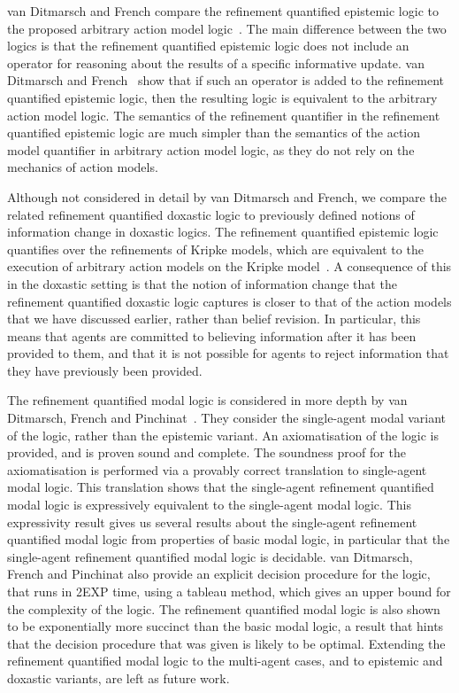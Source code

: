 van Ditmarsch and French compare the refinement quantified epistemic logic to
the proposed arbitrary action model logic~\cite{french2009simulation}. The main
difference between the two logics is that the refinement quantified epistemic
logic does not include an operator for reasoning about the results of a specific
informative update. van Ditmarsch and French~\cite{french2009simulation} show
that if such an operator is added to the refinement quantified epistemic logic,
then the resulting logic is equivalent to the arbitrary action model logic. The
semantics of the refinement quantifier in the refinement quantified epistemic
logic are much simpler than the semantics of the action model quantifier in
arbitrary action model logic, as they do not rely on the mechanics of action
models.

Although not considered in detail by van Ditmarsch and French, we compare the
related refinement quantified doxastic logic to previously defined notions of
information change in doxastic logics. The refinement quantified epistemic logic
quantifies over the refinements of Kripke models, which are equivalent to the
execution of arbitrary action models on the Kripke
model~\cite{french2009simulation}. A consequence of this in the doxastic setting
is that the notion of information change that the refinement quantified doxastic
logic captures is closer to that of the action models that we have discussed
earlier, rather than belief revision. In particular, this means that agents are
committed to believing information after it has been provided to them, and that
it is not possible for agents to reject information that they have previously
been provided.

The refinement quantified modal logic is considered in more depth by van
Ditmarsch, French and Pinchinat~\cite{french2010future}. They consider the
single-agent modal variant of the logic, rather than the epistemic variant. An
axiomatisation of the logic is provided, and is proven sound and complete. The
soundness proof for the axiomatisation is performed via a provably correct
translation to single-agent modal logic. This translation shows that the
single-agent refinement quantified modal logic is expressively equivalent to the
single-agent modal logic. This expressivity result gives us several results
about the single-agent refinement quantified modal logic from properties of
basic modal logic, in particular that the single-agent refinement quantified
modal logic is decidable. van Ditmarsch, French and Pinchinat also provide an
explicit decision procedure for the logic, that runs in 2EXP time, using a
tableau method, which gives an upper bound for the complexity of the logic. The
refinement quantified modal logic is also shown to be exponentially more
succinct than the basic modal logic, a result that hints that the decision
procedure that was given is likely to be optimal. Extending the refinement
quantified modal logic to the multi-agent cases, and to epistemic and doxastic
variants, are left as future work.
